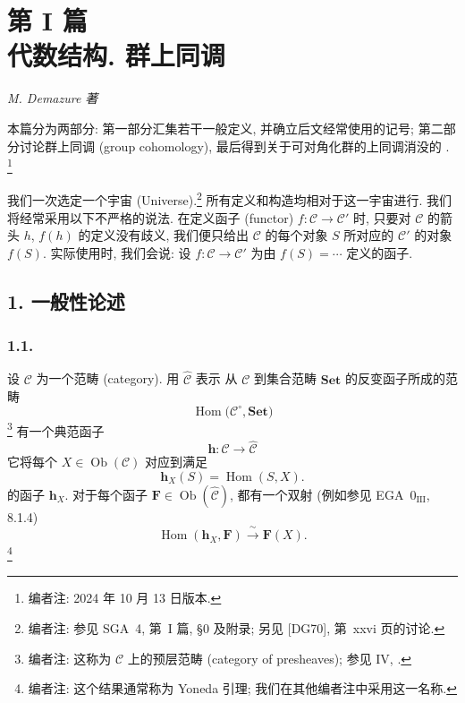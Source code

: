 \setcounter{footnote}{0}
\chapter*{第 I 篇\\代数结构. 群上同调}

\begin{center}
  \textit{M. Demazure 著}
\end{center}

本篇分为两部分: 第一部分汇集若干一般定义, 并确立后文经常使用的记号;
第二部分讨论群上同调 (group cohomology), 最后得到关于可对角化群的上同调消没的
.
\footnote{编者注: 2024 年 10 月 13 日版本.}

我们一次选定一个宇宙 (Universe).\footnote{编者注: 参见 SGA~4,
第~I 篇, \S0 及附录; 另见 [DG70], 第~xxvi 页的讨论.}
所有定义和构造均相对于这一宇宙进行. 我们将经常采用以下不严格的说法.
在定义函子 (functor) \(f:\mathscr C\to\mathscr C'\) 时,
只要对 \(\mathscr C\) 的箭头 \(h\), \(f(h)\) 的定义没有歧义,
我们便只给出 \(\mathscr C\) 的每个对象 \(S\) 所对应的
\(\mathscr C'\) 的对象 \(f(S)\).
实际使用时, 我们会说: 设 \(f:\mathscr C\to\mathscr C'\) 为由
\(f(S)=\cdots\) 定义的函子.

\section*{1. 一般性论述}

\subsection*{1.1.}

设 \(\mathscr C\) 为一个范畴 (category). 用 \(\widehat{\mathscr C}\) 表示
从 \(\mathscr C\) 到集合范畴 \(\mathbf{Set}\) 的反变函子所成的范畴
\[
  \operatorname{Hom}\bigl(\mathscr C^{\circ},\mathbf{Set}\bigr)
\]
\footnote{编者注: 这称为 \(\mathscr C\) 上的预层范畴 (category of presheaves);
参见 IV, .}
有一个典范函子
\[
  \mathbf h:\mathscr C\longrightarrow\widehat{\mathscr C}
\]
它将每个 \(X\in\operatorname{Ob}(\mathscr C)\) 对应到满足
\[
  \mathbf h_X(S)=\operatorname{Hom}(S,X).
\]
的函子 \(\mathbf h_X\).
对于每个函子 \(\mathbf F\in\operatorname{Ob}(\widehat{\mathscr C})\),
都有一个双射 (例如参见 EGA~\(0_{\mathrm{III}}\), 8.1.4)
\[
  \operatorname{Hom}(\mathbf h_X,\mathbf F)
    \xrightarrow{\ \sim\ } \mathbf F(X).
\]
\footnote{编者注: 这个结果通常称为 Yoneda 引理; 我们在其他编者注中采用这一名称.}

